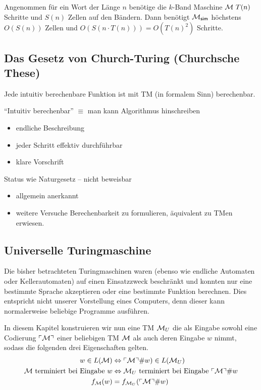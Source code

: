 \begin{Bemerkung}
	Angenommen für ein Wort der Länge $n$ benötige die $k$-Band Maschine $\mathcal{M}\ T(n)$ Schritte und $S(n)$ Zellen auf den Bändern.
	Dann benötigt $\mathcal{M}_\mathsf{sim}$ höchstens $O(S(n))$ Zellen und $O(S(n\cdot T(n)))=O(T(n)^2)$ Schritte.
\end{Bemerkung}

\subsection{Das Gesetz von Church-Turing (Churchsche These)} %
\begin{Satz}[name={[Intuitiv berechenbare Funktionen sind mit \acs*{TM} berechenbar]}]
	Jede intuitiv berechenbare Funktion ist mit \ac{TM} (in formalem Sinn) berechenbar.
	
	"`Intuitiv berechenbar"' $\equiv$ man kann Algorithmus hinschreiben
	\begin{itemize}
		\item endliche Beschreibung
		\item jeder Schritt effektiv durchführbar
		\item klare Vorschrift
	\end{itemize}
	Status wie Naturgesetz -- nicht beweisbar
	\begin{itemize}[label=\->]
		\item allgemein anerkannt
		\item weitere Versuche Berechenbarkeit zu formulieren, äquivalent zu \ac{TM}en erwiesen.
	\end{itemize}
\end{Satz}



\subsection{Universelle Turingmaschine}
Die bisher betrachteten Turingmaschinen waren (ebenso wie endliche Automaten oder Kellerautomaten) 
auf einen Einsatzzweck beschränkt und konnten nur eine bestimmte Sprache akzeptieren oder eine bestimmte Funktion berechnen.
Dies entspricht nicht unserer Vorstellung eines Computers, denn dieser kann normalerweise beliebige Programme ausführen.

In diesem Kapitel konstruieren wir nun eine \ac{TM} $\mathcal{M}_U$ die als Eingabe sowohl
eine Codierung $\ulcorner \mathcal{M} \urcorner$ einer beliebigen \ac{TM} $\mathcal{M}$ als auch deren Eingabe $w$ nimmt, sodass die folgenden drei Eigenschaften gelten.
\begin{align}
	\label{Mu-eq-lang} w\in L(\mathcal{M}) &\Leftrightarrow \ulcorner \mathcal{M} \urcorner\#w) \in L(\mathcal{M}_U)\\ 
	\label{Mu-eq-term} \text{$\mathcal{M}$ terminiert bei Eingabe $w$} &\Leftrightarrow \text{$\mathcal{M}_U$ terminiert bei Eingabe $\ulcorner \mathcal{M} \urcorner\#w$}\\
	\label{Mu-eq-func} \text{$f_{\mathcal{M}}(w)$} &= \text{$f_{\mathcal{M}_U}(\ulcorner \mathcal{M} \urcorner\#w)$}
\end{align}

